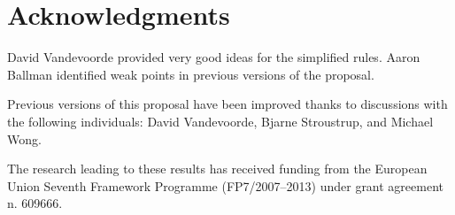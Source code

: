 \section*{Acknowledgments}

David Vandevoorde provided very good ideas for the simplified rules. Aaron Ballman identified weak
points in previous versions of the proposal.

Previous versions of this proposal have been improved thanks to discussions with the following individuals:
David Vandevoorde,
Bjarne Stroustrup, and
Michael Wong.

The research leading to these results has received funding from the European
Union Seventh Framework Programme (FP7/2007--2013) under grant agreement n.
609666.
